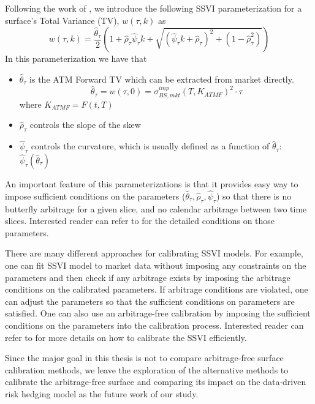 \documentclass[letterpaper,12pt,titlepage,oneside,final]{book}
\numberwithin{equation}{section}
\theoremstyle{definition}
\begin{document}
Following the work of \cite{corbetta2019robust}, we introduce the following SSVI parameterization for a surface's Total Variance (TV), $w(\tau,k)$ as
\begin{equation}
w(\tau,k) = \frac{\hat{\theta}_{\tau}}{2}\left( 1 + \hat{\rho}_{\tau} \hat{\psi}_{\tau} k + \sqrt{ \left(\hat{\psi}_{\tau} k + \hat{\rho}_{\tau} \right)^2 + \left(1 - \hat{\rho}_{\tau}^2 \right) } \right)
\label{eqn:w}
\end{equation}
In this parameterization we have that 
\begin{itemize}
	\item $\hat{\theta}_{\tau}$ is the ATM Forward TV which can be extracted from market directly.
	\[
	\hat{\theta}_{\tau} = w(\tau,0) = \sigma^{imp}_{BS,mkt}(T,K_{ATMF})^2 \cdot \tau
	\]
	where $K_{ATMF}=F(t,T)$
	\item $\hat{\rho}_{\tau}$ controls the slope of the skew 
	\item $\hat{\psi}_{\tau}$ controls the curvature, which is usually defined as a function of  $\hat{\theta}_{\tau}$: $\hat{\psi}_{\tau}(\hat{\theta}_{\tau})$
\end{itemize}

An important feature of this parameterizations is that it provides easy way to impose sufficient conditions on the  parameters ($\hat{\theta}_{\tau},\hat{\rho}_{\tau},\hat{\psi}_{\tau}$) so that there is no butterfly arbitrage for a given slice, and no calendar arbitrage between two time slices. Interested reader can refer to \cite{corbetta2019robust,gatheral2014arbitrage} for the detailed conditions on those parameters. 

There are many different approaches for calibrating SSVI models. For example, one can  fit SSVI model to market data without imposing any constraints on the parameters and then check if any arbitrage exists by imposing the arbitrage conditions on  the calibrated parameters. If arbitrage conditions are violated, one can adjust the parameters so that the sufficient conditions on parameters are satisfied.
One can also  use an arbitrage-free calibration \cite{corbetta2019robust} by imposing the  sufficient conditions on the parameters into the calibration process. Interested reader can refer to \cite{hendriks2017extended,corbetta2019robust} for more details on how to calibrate the SSVI efficiently.

Since the major goal in this thesis is not to compare  arbitrage-free surface calibration methods, we leave the exploration of the alternative methods to calibrate the arbitrage-free surface and comparing its impact on the data-driven risk hedging model as the future work of our study. 
\end{document}

